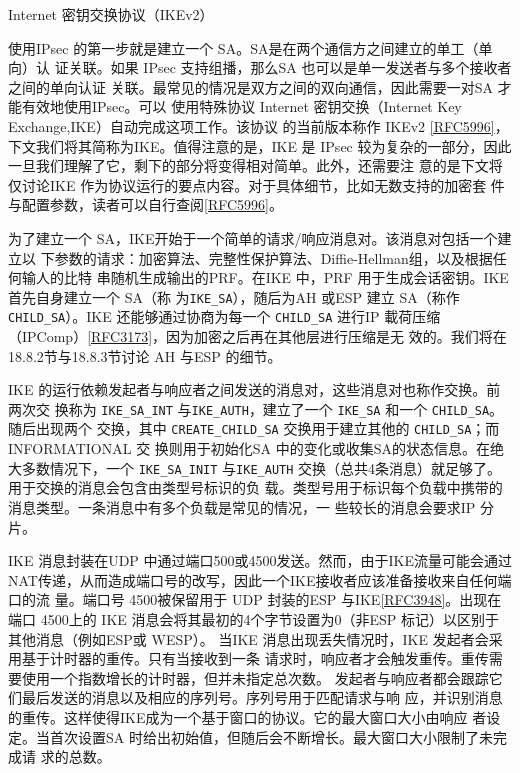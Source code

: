 Internet 密钥交换协议（IKEv2）

使用IPsec 的第一步就是建立一个 SA。SA是在两个通信方之间建立的单工（单向）认
证关联。如果 IPsec 支持组播，那么SA 也可以是单一发送者与多个接收者之间的单向认证
关联。最常见的情况是双方之间的双向通信，因此需要一对SA 才能有效地使用IPsec。可以
使用特殊协议 Internet 密钥交换（Internet Key Exchange,IKE）自动完成这项工作。该协议
的当前版本称作 IKEv2 \href{https://www.rfc-editor.org/rfc/rfc5996}{[RFC5996]}，下文我们将其简称为IKE。值得注意的是，IKE 是 IPsec
较为复杂的一部分，因此一旦我们理解了它，剩下的部分将变得相对简单。此外，还需要注
意的是下文将仅讨论IKE 作为协议运行的要点内容。对于具体细节，比如无数支持的加密套
件与配置参数，读者可以自行查阅\href{https://www.rfc-editor.org/rfc/rfc5996}{[RFC5996]}。

为了建立一个 SA，IKE开始于一个简单的请求/响应消息对。该消息对包括一个建立以
下参数的请求：加密算法、完整性保护算法、Diffie-Hellman组，以及根据任何输人的比特
串随机生成输出的PRF。在IKE 中，PRF 用于生成会话密钥。IKE 首先自身建立一个 SA（称
为\verb|IKE_SA|），随后为AH 或ESP 建立 SA（称作 \verb|CHILD_SA|）。IKE 还能够通过协商为每一个
\verb|CHILD_SA| 进行IP 載荷压缩（IPComp）\href{https://www.rfc-editor.org/rfc/rfc3173}{[RFC3173]}，因为加密之后再在其他层进行压缩是无
效的。我们将在18.8.2节与18.8.3节讨论 AH 与ESP 的细节。

IKE 的运行依赖发起者与响应者之间发送的消息对，这些消息对也称作交换。前两次交
换称为 \verb|IKE_SA_INT| 与\verb|IKE_AUTH|，建立了一个 \verb|IKE_SA| 和一个 \verb|CHILD_SA|。随后出现两个
交换，其中 \verb|CREATE_CHILD_SA| 交换用于建立其他的 \verb|CHILD_SA|；而 INFORMATIONAL 交
换则用于初始化SA 中的变化或收集SA的状态信息。在绝大多数情况下，一个 \verb|IKE_SA_INIT|
与\verb|IKE_AUTH| 交换（总共4条消息）就足够了。用于交换的消息会包含由类型号标识的负
载。类型号用于标识每个负载中携带的消息类型。一条消息中有多个负载是常见的情况，一
些较长的消息会要求IP 分片。

IKE 消息封装在UDP 中通过端口500或4500发送。然而，由于IKE流量可能会通过
NAT传递，从而造成端口号的改写，因此一个IKE接收者应该准备接收来自任何端口的流
量。端口号 4500被保留用于 UDP 封装的ESP 与IKE\href{https://www.rfc-editor.org/rfc/rfc3948}{[RFC3948]}。出现在端口 4500上的 IKE
消息会将其最初的4个字节设置为0（非ESP 标记）以区别于其他消息（例如ESP或 WESP）。
当IKE 消息出现丢失情况时，IKE 发起者会采用基于计时器的重传。只有当接收到一条
请求时，响应者才会触发重传。重传需要使用一个指数增长的计时器，但并未指定总次数。
发起者与响应者都会跟踪它们最后发送的消息以及相应的序列号。序列号用于匹配请求与响
应，并识别消息的重传。这样使得IKE成为一个基于窗口的协议。它的最大窗口大小由响应
者设定。当首次设置SA 时给出初始值，但随后会不断增长。最大窗口大小限制了未完成请
求的总数。

